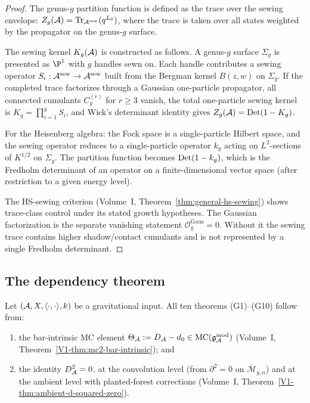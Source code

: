 \begin{proof}
The genus-$g$ partition function is defined as the trace over the
sewing envelope:
$Z_g(\mathcal{A}) = \operatorname{Tr}_{\mathcal{A}^{\mathrm{sew}}}(q^{L_0})$, where the trace
is taken over all states weighted by the propagator on the genus-$g$
surface.

The sewing kernel \(K_g(\mathcal{A})\) is constructed as follows. A genus-$g$
surface $\Sigma_g$ is presented as $\P^1$ with $g$ handles sewn on.
Each handle contributes a sewing operator
$S_i: \mathcal{A}^{\mathrm{sew}} \to \mathcal{A}^{\mathrm{sew}}$ built from the
Bergman kernel $B(z,w)$ on $\Sigma_g$. If the completed trace
factorizes through a Gaussian one-particle propagator, all connected
cumulants \(C^{(r)}_g\) for \(r\ge3\) vanish, the total one-particle
sewing kernel is \(K_g=\prod_{i=1}^{g}S_i\), and Wick's determinant
identity gives \(Z_g(\mathcal{A})=\operatorname{Det}(1-K_g)\).

For the Heisenberg algebra: the Fock space is a single-particle
Hilbert space, and the sewing operator reduces to a single-particle
operator $k_g$ acting on $L^2$-sections of $K^{1/2}$ on $\Sigma_g$.
The partition function becomes $\operatorname{Det}(1 - k_g)$, which is the
Fredholm determinant of an operator on a finite-dimensional
vector space (after restriction to a given energy level).

The HS-sewing criterion (Volume~I, Theorem~\ref{thm:general-hs-sewing})
shows trace-class control under its stated growth hypotheses. The
Gaussian factorization is the separate vanishing statement
\(\mathcal O^{\mathrm{Gaus}}_g=0\). Without it the sewing trace
contains higher shadow/contact cumulants and is not represented by a
single Fredholm determinant.
\end{proof}


\subsection{The dependency theorem}

\begin{theorem}
\label{thm:thqg-dependency}
Let $(\mathcal{A}, X, \langle\cdot,\cdot\rangle, k)$ be a gravitational input.
All ten theorems \textup{(G1)--(G10)} follow from:
\begin{enumerate}[label=\textup{(\roman*)}]
\item the bar-intrinsic MC element $\Theta_{\mathcal{A}} := D_{\mathcal{A}} - d_0 \in \mathrm{MC}(\mathfrak{g}_{\mathcal{A}}^{\mathrm{mod}})$
 (Volume~I, Theorem~\ref*{V1-thm:mc2-bar-intrinsic}); and
\item the identity $D_{\mathcal{A}}^2 = 0$, at the convolution level
 (from $\partial^2 = 0$ on $\overline{\mathcal{M}}_{g,n}$)
 and at the ambient level with planted-forest corrections
 (Volume~I, Theorem~\ref{V1-thm:ambient-d-squared-zero}).
\end{enumerate}
\end{theorem}

